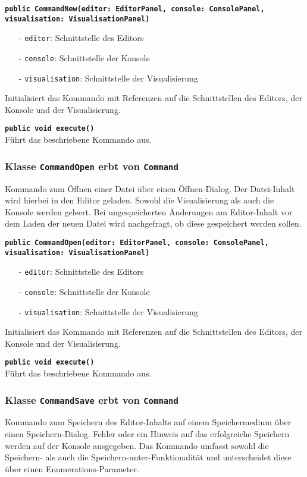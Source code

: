 \documentclass[parskip=full,11pt,twoside]{scrartcl}
\begin{document}
\textbf{\texttt{public CommandNew(editor: EditorPanel, console: ConsolePanel,\\visualisation: VisualisationPanel)}}\\
\begin{itemize}[noitemsep]
	\item[-] \texttt{editor}: Schnittstelle des Editors
	\item[-] \texttt{console}: Schnittstelle der Konsole
	\item[-] \texttt{visualisation}: Schnittstelle der Visualisierung
\end{itemize}
Initialisiert das Kommando mit Referenzen auf die Schnittstellen des Editors, der Konsole und der Visualisierung.

\textbf{\texttt{public void execute()}}\\
Führt das beschriebene Kommando aus.

\subsubsection{Klasse \texttt{CommandOpen} erbt von \texttt{Command}}
Kommando zum Öffnen einer Datei über einen Öffnen-Dialog. Der Datei-Inhalt wird hierbei in den Editor geladen. Sowohl die Visualisierung als auch die Konsole werden geleert. Bei ungespeicherten Änderungen am Editor-Inhalt vor dem Laden der neuen Datei wird nachgefragt, ob diese gespeichert werden sollen.

\textbf{\texttt{public CommandOpen(editor: EditorPanel, console: ConsolePanel,\\visualisation: VisualisationPanel)}}\\
\begin{itemize}[noitemsep]
	\item[-] \texttt{editor}: Schnittstelle des Editors
	\item[-] \texttt{console}: Schnittstelle der Konsole
	\item[-] \texttt{visualisation}: Schnittstelle der Visualisierung
\end{itemize}
Initialisiert das Kommando mit Referenzen auf die Schnittstellen des Editors, der Konsole und der Visualisierung.

\textbf{\texttt{public void execute()}}\\
Führt das beschriebene Kommando aus.

\subsubsection{Klasse \texttt{CommandSave} erbt von \texttt{Command}}
Kommando zum Speichern des Editor-Inhalts auf einem Speichermedium über einen Speichern-Dialog. Fehler oder ein Hinweis auf das erfolgreiche Speichern werden auf der Konsole ausgegeben. Das Kommando umfasst sowohl die Speichern- als auch die Speichern-unter-Funktionalität und unterscheidet diese über einen Enumerations-Parameter.
\end{document}
